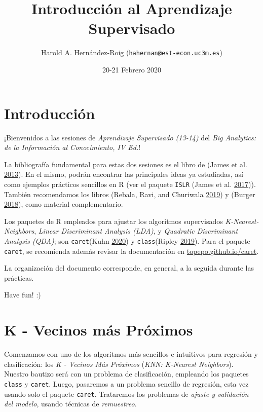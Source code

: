 \documentclass[]{book}
\title{Introducción al Aprendizaje Supervisado}
\author{Harold A. Hernández-Roig (\href{mailto:hahernan@est-econ.uc3m.es}{\nolinkurl{hahernan@est-econ.uc3m.es}})}
\date{20-21 Febrero 2020}
\begin{document}
\maketitle

{
\setcounter{tocdepth}{1}
\tableofcontents
}
\hypertarget{introducciuxf3n}{%
\chapter{Introducción}\label{introducciuxf3n}}

¡Bienvenidos a las sesiones de \emph{Aprendizaje Supervisado (13-14)} del \emph{Big Analytics: de la Información al Conocimiento, IV Ed.}!

La bibliografía fundamental para estas dos sesiones es el libro de (James et al. \protect\hyperlink{ref-james2013introduction}{2013}). En el mismo, podrán encontrar las principales ideas ya estudiadas, así como ejemplos prácticos sencillos en R (ver el paquete \texttt{ISLR} (James et al. \protect\hyperlink{ref-R-ISLR}{2017})). También recomendamos los libros (Rebala, Ravi, and Churiwala \protect\hyperlink{ref-Rebala2019}{2019}) y (Burger \protect\hyperlink{ref-Burger2018}{2018}), como material complementario.

Los paquetes de R empleados para ajustar los algoritmos supervisados \emph{K-Nearest-Neighbors}, \emph{Linear Discriminant Analysis (LDA)}, y \emph{Quadratic Discriminant Analysis (QDA)}; son \texttt{caret}(Kuhn \protect\hyperlink{ref-R-caret}{2020}) y \texttt{class}(Ripley \protect\hyperlink{ref-R-class}{2019}). Para el paquete \texttt{caret}, se recomienda además revisar la documentación en \href{http://topepo.github.io/caret/index.html}{topepo.github.io/caret}.

La organización del documento corresponde, en general, a la seguida durante las prácticas.

Have fun! :)

\hypertarget{k---vecinos-muxe1s-pruxf3ximos}{%
\chapter{K - Vecinos más Próximos}\label{k---vecinos-muxe1s-pruxf3ximos}}

Comenzamos con uno de los algoritmos más sencillos e intuitivos para regresión y clasificación: los \emph{K - Vecinos Más Próximos} (\emph{KNN: K-Nearest Neighbors}). Nuestro bautizo será con un problema de clasificación, empleando los paquetes \texttt{class} y \texttt{caret}. Luego, pasaremos a un problema sencillo de regresión, esta vez usando solo el paquete \texttt{caret}. Trataremos los problemas de \emph{ajuste y validación del modelo}, usando técnicas de \emph{remuestreo}.
\end{document}
